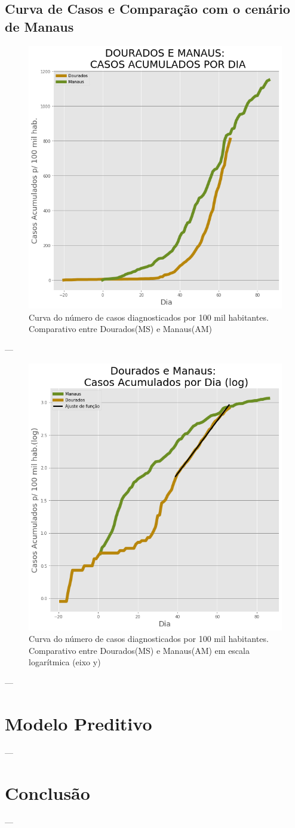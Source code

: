 \documentclass[12pt]{article}
\begin{document}
\subsection{Curva de Casos e Comparação com o cenário de Manaus}\label{ssec:curvaMAU}

\begin{figure}[!htb]
  \centering
  \includegraphics[width=.6\textwidth]{figs/Dourados_Manaus_casos.png}
  \caption{Curva do número de casos diagnosticados por 100 mil habitantes. Comparativo entre Dourados(MS) e Manaus(AM)}
  \label{fig:curva100K}
  \end{figure}
---

\begin{figure}[!htb]
  \centering
  \includegraphics[width=.6\textwidth]{figs/Dourados_Manaus_casos_log.png}
  \caption{Curva do número de casos diagnosticados por 100 mil habitantes. Comparativo entre Dourados(MS) e Manaus(AM) em escala logarítmica (eixo y)}
  \label{fig:curva100KLog}
  \end{figure}

---


\section{Modelo Preditivo}

---

\section{Conclusão}\label{conc}

---



\end{document}
